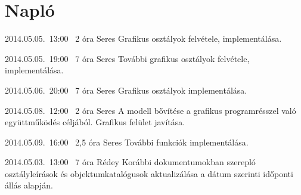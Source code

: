 %
\section{Napló}

\begin{naplo}

\bejegyzes
{2014.05.05.~13:00~}
{2 óra}
{Seres}
{Grafikus osztályok felvétele, implementálása.}

\bejegyzes
{2014.05.05.~19:00~}
{7 óra}
{Seres}
{További grafikus osztályok felvétele, implementálása.}

\bejegyzes
{2014.05.06.~20:00~}
{7 óra}
{Seres}
{Grafikus osztályok implementálása.}

\bejegyzes
{2014.05.08.~12:00~}
{2 óra}
{Seres}
{A modell bővítése a grafikus programrésszel való együttműködés céljából. Grafikus felület javítása.}

\bejegyzes
{2014.05.09.~16:00~}
{2,5 óra}
{Seres}
{További funkciók implementálása.}


\bejegyzes
{2014.05.03.~13:00~}
{7 óra}
{Rédey}
{Korábbi dokumentumokban szerepló osztályleírások és objektumkatalógusok aktualizálása a dátum szerinti időponti állás alapján.}


\end{naplo}

